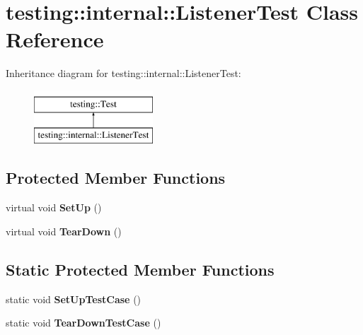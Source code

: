 \hypertarget{classtesting_1_1internal_1_1_listener_test}{}\section{testing\+:\+:internal\+:\+:Listener\+Test Class Reference}
\label{classtesting_1_1internal_1_1_listener_test}
Inheritance diagram for testing\+:\+:internal\+:\+:Listener\+Test\+:\begin{figure}[H]
\begin{center}
\leavevmode
\includegraphics[height=2.000000cm]{classtesting_1_1internal_1_1_listener_test}
\end{center}
\end{figure}
\subsection*{Protected Member Functions}
\begin{DoxyCompactItemize}
\item 
\mbox{\label{classtesting_1_1internal_1_1_listener_test_ace3dbe36b705ddf320518e6cdd919bc8}} 
virtual void {\bfseries Set\+Up} ()
\item 
\mbox{\label{classtesting_1_1internal_1_1_listener_test_ad112535025d668e3ea14e71d8741c810}} 
virtual void {\bfseries Tear\+Down} ()
\end{DoxyCompactItemize}
\subsection*{Static Protected Member Functions}
\begin{DoxyCompactItemize}
\item 
\mbox{\label{classtesting_1_1internal_1_1_listener_test_a7cbc298576e584b4021d0375204b7391}} 
static void {\bfseries Set\+Up\+Test\+Case} ()
\item 
\mbox{\label{classtesting_1_1internal_1_1_listener_test_aa35b5f1c6235f0fe98aa2c7f35bb8fe1}} 
static void {\bfseries Tear\+Down\+Test\+Case} ()
\end{DoxyCompactItemize}
